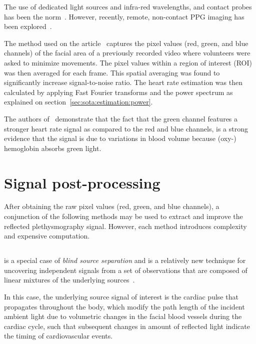 The use of dedicated light sources and infra-red wavelengths, and contact probes
has been the norm~\cite{Ulyanov1993Pulse, Greneker1997Radar, Garbey2007Contact}.
However, recently, remote, non-contact PPG imaging has been
explored~\cite{Wieringa2005Contactless, Hu2008Feasibility}.

The method used on the article~\cite{Verkruysse2008Remote} captures the pixel
values (red, green, and blue channels) of the facial area of a previously
recorded video where volunteers were asked to minimize movements. The pixel
values within a region of interest (ROI) was then averaged for each frame.
This spatial averaging was found to significantly increase signal-to-noise
ratio. The heart rate estimation was then calculated by applying Fast Fourier
transforms and the power spectrum as explained on
section~\ref{sec:sota:estimation:power}.

The authors of~\cite{Verkruysse2008Remote} demonstrate that the fact that
the green channel features a stronger heart rate signal as compared to the
red and blue channels, is a strong evidence that the signal is due to
variations in blood volume because (oxy-) hemoglobin absorbs green light.

\section{Signal post-processing} \label{sec:sota:post}

After obtaining the raw pixel values (red, green, and blue channels), a
conjunction of the following methods may be used to extract and improve the
reflected plethysmography signal. However, each method introduces complexity
and expensive computation.

\subsection{\ica} \label{sec:sota:post:ica}

\ica{} is a special case of \emph{blind source separation} and is a relatively
new technique for uncovering independent signals from a set of observations
that are composed of linear mixtures of the underlying
sources~\cite{Comon1994Independent}.

In this case, the underlying source signal of interest is the cardiac pulse
that propagates throughout the body, which modify the path length of the
incident ambient light due to volumetric changes in the facial blood vessels
during the cardiac cycle, such that subsequent changes in amount of reflected
light indicate the timing of cardiovascular events.

